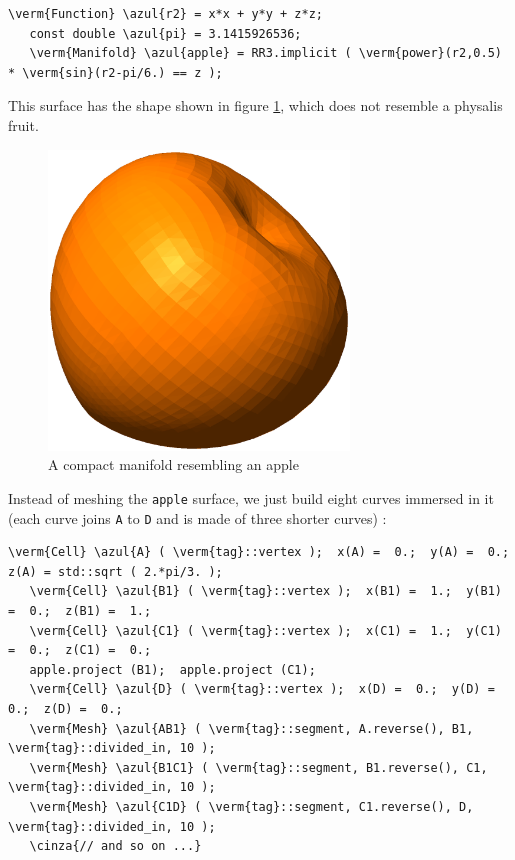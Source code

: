 \begin{Verbatim}[commandchars=\\\{\},formatcom=\small\tt,frame=single,
   label=parag-\ref{\numb section 2.\numb parag 11}.cpp,rulecolor=\color{coment},
   baselinestretch=0.94,framesep=2mm]
   \verm{Function} \azul{r2} = x*x + y*y + z*z;
   const double \azul{pi} = 3.1415926536;
   \verm{Manifold} \azul{apple} = RR3.implicit ( \verm{power}(r2,0.5) * \verm{sin}(r2-pi/6.) == z );
\end{Verbatim}

This surface has the shape shown in figure \ref{\numb section 2.\numb fig 12},
which does not resemble a physalis fruit.

\begin{figure}[ht] \centering
  \includegraphics[width=80mm]{fisalis-manif}
  \caption{A compact manifold resembling an apple}
  \label{\numb section 2.\numb fig 12}
\end{figure}

Instead of meshing the {\small\tt apple} surface, we just build eight curves immersed in it
(each curve joins {\small\tt A} to {\small\tt D} and is made of three shorter curves) :

\begin{Verbatim}[commandchars=\\\{\},formatcom=\small\tt,frame=single,
   label=parag-\ref{\numb section 2.\numb parag 11}.cpp,rulecolor=\color{coment},
   baselinestretch=0.94,framesep=2mm]
   \verm{Cell} \azul{A} ( \verm{tag}::vertex );  x(A) =  0.;  y(A) =  0.;  z(A) = std::sqrt ( 2.*pi/3. );
   \verm{Cell} \azul{B1} ( \verm{tag}::vertex );  x(B1) =  1.;  y(B1) =  0.;  z(B1) =  1.;
   \verm{Cell} \azul{C1} ( \verm{tag}::vertex );  x(C1) =  1.;  y(C1) =  0.;  z(C1) =  0.;
   apple.project (B1);  apple.project (C1);
   \verm{Cell} \azul{D} ( \verm{tag}::vertex );  x(D) =  0.;  y(D) =  0.;  z(D) =  0.;
   \verm{Mesh} \azul{AB1} ( \verm{tag}::segment, A.reverse(), B1, \verm{tag}::divided_in, 10 );
   \verm{Mesh} \azul{B1C1} ( \verm{tag}::segment, B1.reverse(), C1, \verm{tag}::divided_in, 10 );
   \verm{Mesh} \azul{C1D} ( \verm{tag}::segment, C1.reverse(), D, \verm{tag}::divided_in, 10 );
   \cinza{// and so on ...}
\end{Verbatim}


